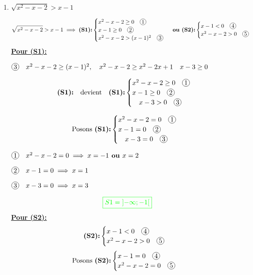 \documentclass[12pt,a4paper]{article}
\begin{document}
\begin{enumerate}
\begin{enumerate}
\item \( \sqrt{x^{2}-x-2} > x-1 \)

\[
\sqrt{x^2 - x - 2} > x - 1 \implies \textbf{(S1):}
\begin{cases}
x^2 - x - 2 \geq 0 \quad \encercle{1} \\
x - 1 \geq 0 \quad \encercle{2} \\
x^2 - x - 2 > (x-1)^2 \quad \encercle{3}
\end{cases}\textbf{ ou }
\textbf{(S2):}\begin{cases}
x - 1 < 0 \quad \encercle{4} \\
x^2 - x - 2 > 0 \quad \encercle{5}
\end{cases}
\]
\underline{\textbf{Pour (S1):}}

\(
\encercle{3}\quad x^2 - x - 2 \geq (x-1)^2 , \\
\quad x^2 - x - 2 \geq x^{2}-2x+1\\
\quad x - 3 \geq 0
\)


\[\textbf{(S1):} \quad \text{devient} \quad \textbf{(S1):}
\begin{cases}
x^2 - x - 2 \geq 0  \quad \encercle{1}\\
x - 1 \geq 0  \quad \encercle{2}\\
\quad x - 3 > 0 \quad \encercle{3}
\end{cases}
\]

\[\text{Posons }\textbf{(S1):}
\begin{cases}
x^2 - x - 2 = 0  \quad \encercle{1}\\
x - 1  = 0 \quad \encercle{2}\\
\quad x - 3 = 0 \quad \encercle{3}
\end{cases}
\]

\(\encercle{1} \quad x^2 - x - 2 = 0 \implies x=-1 \textbf{ ou } x=2\)

\(\encercle{2} \quad x - 1 = 0 \implies x=1 \)

\(\encercle{3} \quad x - 3 = 0 \implies x=3 \)
\begin{flushleft}
\end{flushleft}
\[
\textcolor{green}{\boxed{S1 = \left]-\infty ; -1\right[  }} 
\]
\underline{\textbf{Pour (S2):}}
\[
\textbf{(S2):}\begin{cases}
x - 1 < 0 \quad \encercle{4} \\
x^2 - x - 2 > 0 \quad \encercle{5}
\end{cases}
\]
\[\text{Posons }\textbf{(S2):}
\begin{cases}
x - 1 = 0 \quad \encercle{4} \\
x^2 - x - 2 = 0 \quad \encercle{5}
\end{cases}
\]


\end{enumerate}
\end{enumerate}
\end{document}
